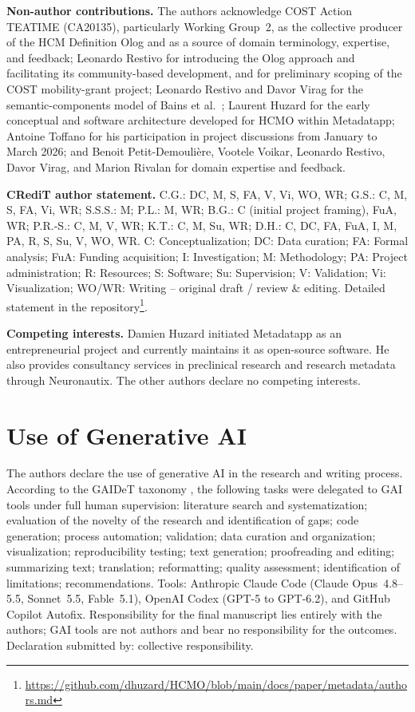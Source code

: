 \documentclass[runningheads]{llncs}
\newcommand{\new}[1]{\textcolor{blue!70!black}{#1}}
\newcommand{\new}[1]{#1}
\newcommand{\fnurl}[1]{\footnote{\url{#1}}}
\begin{document}
\textbf{Non-author contributions.}
\new{The authors acknowledge COST Action TEATIME (CA20135), particularly Working
Group~2, as the collective producer of the HCM Definition Olog and as a source
of domain terminology, expertise, and feedback; Leonardo Restivo for
introducing the Olog approach and facilitating its community-based
development, and for preliminary scoping of the COST mobility-grant project;
Leonardo Restivo and Davor Virag for the semantic-components model of Bains et
al.\ \cite{bains2025}; Laurent Huzard for the early conceptual and
software architecture developed for HCMO within Metadatapp; Antoine Toffano
for his participation in project discussions from January to March 2026; and Benoit
Petit-Demoulière, Vootele Voikar, Leonardo Restivo, Davor Virag, and Marion
Rivalan for domain expertise and feedback.}

\textbf{CRediT author statement.}
\new{C.G.: DC, M, S, FA, V, Vi, WO, WR;
G.S.: C, M, S, FA, Vi, WR;
S.S.S.: M;
P.L.: M, WR;
B.G.: C (initial project framing), FuA, WR;
P.R.-S.: C, M, V, WR;
K.T.: C, M, Su, WR;
D.H.: C, DC, FA, FuA, I, M, PA, R, S, Su, V, WO, WR.
C: Conceptualization; DC: Data curation; FA: Formal analysis; FuA: Funding
acquisition; I: Investigation; M: Methodology; PA: Project administration;
R: Resources; S: Software; Su: Supervision; V: Validation; Vi: Visualization;
WO/WR: Writing -- original draft / review \& editing. Detailed statement in
the repository\fnurl{https://github.com/dhuzard/HCMO/blob/main/docs/paper/metadata/authors.md}.}

\textbf{Competing interests.}
Damien Huzard initiated Metadatapp as an entrepreneurial project and currently
maintains it as open-source software. He also provides consultancy services in
preclinical research and research metadata through
Neuronautix. The other authors declare no competing
interests.

\section*{Use of Generative AI}
\new{The authors declare the use of generative AI in the research and writing
process. According to the GAIDeT taxonomy \cite{gaidet2026}, the following
tasks were delegated to GAI tools under full human supervision: literature
search and systematization; evaluation of the novelty of the research and
identification of gaps; code generation; process automation; validation; data
curation and organization; visualization; reproducibility testing; text
generation; proofreading and editing; summarizing text; translation;
reformatting; quality assessment; identification of limitations;
recommendations. Tools: Anthropic Claude Code (Claude Opus~4.8--5.5,
Sonnet~5.5, Fable~5.1), OpenAI Codex (GPT-5 to GPT-6.2), and GitHub Copilot
Autofix. Responsibility for the final manuscript lies entirely with the
authors; GAI tools are not authors and bear no responsibility for the outcomes.
Declaration submitted by: collective responsibility.}



\end{document}
